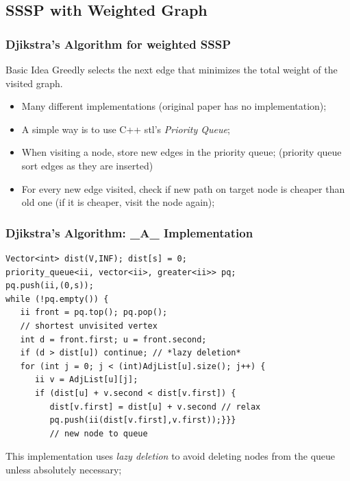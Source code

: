 \documentclass{beamer}
\begin{document}
\subsection{SSSP with Weighted Graph}
\begin{frame}
  \frametitle{Djikstra's Algorithm for weighted SSSP}
  \begin{block}{Basic Idea}
    Greedly selects the next edge that minimizes the total weight of the visited graph.
  \end{block}

  {\small
  \begin{itemize}
  \item Many different implementations (original paper has no implementation);
  \item A simple way is to use C++ stl's \emph{Priority Queue};
  \item When visiting a node, store new edges in the priority queue;
    {\smaller (priority queue sort edges as they are inserted)}
  \item For every new edge visited, check if new path on target node
    is cheaper than old one (if it is cheaper, visit the node again);
  \end{itemize}}
\end{frame}

\begin{frame}
  \frametitle{Djikstra's Algorithm: \_A\_ Implementation}
  {\smaller
    \begin{exampleblock}{}
\begin{verbatim}
Vector<int> dist(V,INF); dist[s] = 0;
priority_queue<ii, vector<ii>, greater<ii>> pq; 
pq.push(ii,(0,s));
while (!pq.empty()) {
   ii front = pq.top(); pq.pop(); 
   // shortest unvisited vertex
   int d = front.first; u = front.second;
   if (d > dist[u]) continue; // *lazy deletion*
   for (int j = 0; j < (int)AdjList[u].size(); j++) { 
      ii v = AdjList[u][j];
      if (dist[u] + v.second < dist[v.first]) { 
         dist[v.first] = dist[u] + v.second // relax
         pq.push(ii(dist[v.first],v.first));}}} 
         // new node to queue
\end{verbatim}
    \end{exampleblock}

    This implementation uses \emph{lazy deletion} to avoid deleting
    nodes from the queue unless absolutely necessary;}
\end{frame}
\end{document}
